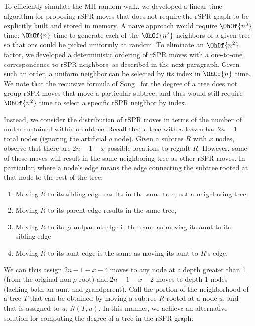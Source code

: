 \documentclass[11pt,onecolumn,conference]{IEEEtran}
\begin{document}
To efficiently simulate the MH random walk, we developed a linear-time algorithm for proposing rSPR moves that does not require the rSPR graph to be explicitly built and stored in memory.
A na\"ive approach would require $\OhOf{n^3}$ time: $\OhOf{n}$ time to generate each of the $\OhOf{n^2}$ neighbors of a given tree so that one could be picked uniformly at random.
To eliminate an $\OhOf{n^2}$ factor, we developed a deterministic ordering of rSPR moves with a one-to-one correspondence to rSPR neighbors, as described in the next paragraph.
Given such an order, a uniform neighbor can be selected by its index in $\OhOf{n}$ time.
We note that the recursive formula of Song~\cite{Song2003-gf} for the degree of a tree does not group rSPR moves that move a particular subtree, and thus would still require $\OhOf{n^2}$ time to select a specific rSPR neighbor by index.

Instead, we consider the distribution of rSPR moves in terms of the number of nodes contained within a subtree.
Recall that a tree with $n$ leaves has $2n-1$ total nodes (ignoring the artificial $\rho$ node).
Given a subtree $R$ with $x$ nodes, observe that there are $2n-1 - x$ possible locations to regraft $R$.
However, some of these moves will result in the same neighboring tree as other rSPR moves.
In particular, where a node's edge means the edge connecting the subtree rooted at that node to the rest of the tree:
\begin{enumerate}
\item Moving $R$ to its sibling edge results in the same tree, not a neighboring tree,
\item Moving $R$ to its parent edge results in the same tree,
\item Moving $R$ to its grandparent edge is the same as moving its aunt to its sibling edge
\item Moving $R$ to its aunt edge is the same as moving its aunt to $R$'s edge.
\end{enumerate}
We can thus assign $2n-1-x-4$ moves to any node at a depth greater than 1 (from the original non-$\rho$ root) and $2n-1-x-2$ moves to depth 1 nodes (lacking both an aunt and grandparent).
Call the portion of the neighborhood of a tree $T$ that can be obtained by moving a subtree $R$ rooted at a node $u$, and that is assigned to $u$, $N(T,u)$.
In this manner, we achieve an alternative solution for computing the degree of a tree in the rSPR graph:
\end{document}
